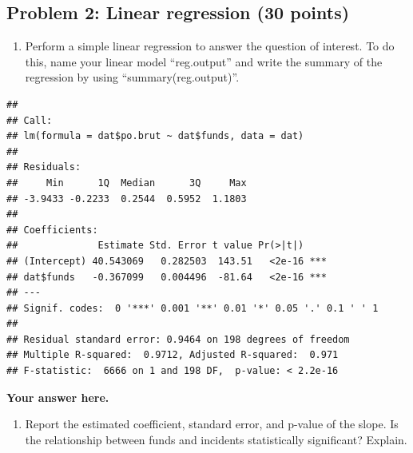 \documentclass[
]{article}
\newenvironment{Shaded}{\begin{snugshade}}{\end{snugshade}}
\newcommand{\AttributeTok}[1]{\textcolor[rgb]{0.77,0.63,0.00}{#1}}
\newcommand{\CommentTok}[1]{\textcolor[rgb]{0.56,0.35,0.01}{\textit{#1}}}
\newcommand{\FunctionTok}[1]{\textcolor[rgb]{0.00,0.00,0.00}{#1}}
\newcommand{\NormalTok}[1]{#1}
\newcommand{\OtherTok}[1]{\textcolor[rgb]{0.56,0.35,0.01}{#1}}
\newcommand{\SpecialCharTok}[1]{\textcolor[rgb]{0.00,0.00,0.00}{#1}}
\providecommand{\tightlist}{%
  \setlength{\itemsep}{0pt}\setlength{\parskip}{0pt}}
\begin{document}
\hypertarget{problem-2-linear-regression-30-points}{%
\subsection{Problem 2: Linear regression (30
points)}\label{problem-2-linear-regression-30-points}}

\begin{enumerate}
\def\labelenumi{\alph{enumi}.}
\tightlist
\item
  Perform a simple linear regression to answer the question of interest.
  To do this, name your linear model ``reg.output'' and write the
  summary of the regression by using ``summary(reg.output)''.
\end{enumerate}

\begin{Shaded}
\end{Shaded}

\begin{verbatim}
## 
## Call:
## lm(formula = dat$po.brut ~ dat$funds, data = dat)
## 
## Residuals:
##     Min      1Q  Median      3Q     Max 
## -3.9433 -0.2233  0.2544  0.5952  1.1803 
## 
## Coefficients:
##              Estimate Std. Error t value Pr(>|t|)    
## (Intercept) 40.543069   0.282503  143.51   <2e-16 ***
## dat$funds   -0.367099   0.004496  -81.64   <2e-16 ***
## ---
## Signif. codes:  0 '***' 0.001 '**' 0.01 '*' 0.05 '.' 0.1 ' ' 1
## 
## Residual standard error: 0.9464 on 198 degrees of freedom
## Multiple R-squared:  0.9712, Adjusted R-squared:  0.971 
## F-statistic:  6666 on 1 and 198 DF,  p-value: < 2.2e-16
\end{verbatim}

\textbf{Your answer here.}

\begin{enumerate}
\def\labelenumi{\alph{enumi}.}
\setcounter{enumi}{1}
\tightlist
\item
  Report the estimated coefficient, standard error, and p-value of the
  slope. Is the relationship between funds and incidents statistically
  significant? Explain.
\end{enumerate}
\end{document}
